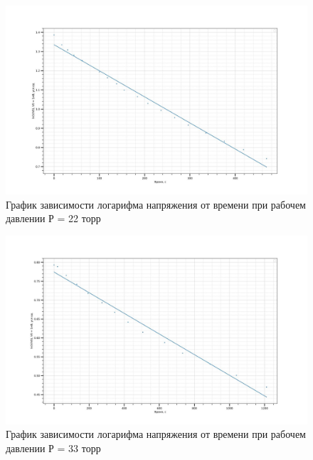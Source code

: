 \documentclass[a4paper,12pt]{article}
\begin{document}
\begin{figure}[H]
  \begin{center}
    \includegraphics[width=16cm]{graphik22.jpg}
    \caption{График зависимости логарифма напряжения от времени при рабочем давлении Р = 22 торр}
    \label{fig:}
  \end{center}
\end{figure}

\begin{figure}[H]
  \begin{center}
    \includegraphics[width=16cm]{graphik33.jpg}
    \caption{График зависимости логарифма напряжения от времени при рабочем давлении Р = 33 торр}
    \label{fig:}
  \end{center}
\end{figure}
\end{document}
